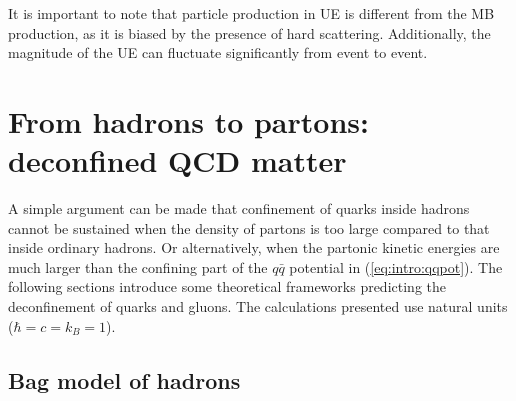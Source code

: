 It is important to note that particle production in UE is different from the MB production, as it is biased by the presence of hard scattering. Additionally, the magnitude of the UE can fluctuate significantly from event to event.

\section{From hadrons to partons: deconfined QCD matter}

A simple argument can be made that confinement of quarks inside hadrons cannot be sustained when the density of partons is too large compared to that inside ordinary hadrons. Or alternatively, when the partonic kinetic energies are much larger than the confining part of the $q\bar{q}$ potential in (\ref{eq:intro:qqpot}). The following sections introduce some theoretical frameworks predicting the deconfinement of quarks and gluons. The calculations presented use natural units ($\hbar = c = k_B = 1$).

\subsection{Bag model of hadrons}

